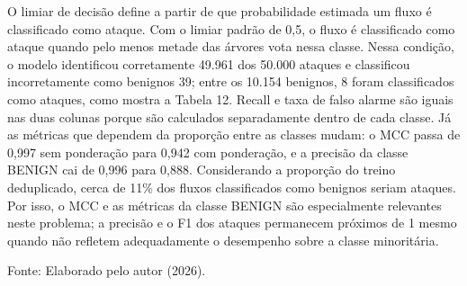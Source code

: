 \documentclass[
    12pt,                %
    openright,           %
    oneside,             %
    a4paper,             %
    english,             %
    brazil               %
]{abntex2}
\begin{document}
O limiar de decisão define a partir de que probabilidade estimada um fluxo é classificado como ataque. Com o limiar padrão de 0,5, o fluxo é classificado como ataque quando pelo menos metade das árvores vota nessa classe. Nessa condição, o modelo identificou corretamente 49.961 dos 50.000 ataques e classificou incorretamente como benignos 39; entre os 10.154 benignos, 8 foram classificados como ataques, como mostra a Tabela 12. Recall e taxa de falso alarme são iguais nas duas colunas porque são calculados separadamente dentro de cada classe. Já as métricas que dependem da proporção entre as classes mudam: o MCC passa de 0,997 sem ponderação para 0,942 com ponderação, e a precisão da classe BENIGN cai de 0,996 para 0,888. Considerando a proporção do treino deduplicado, cerca de 11\% dos fluxos classificados como benignos seriam ataques. Por isso, o MCC e as métricas da classe BENIGN são especialmente relevantes neste problema; a precisão e o F1 dos ataques permanecem próximos de 1 mesmo quando não refletem adequadamente o desempenho sobre a classe minoritária.

\begin{table}
\centering
\caption{Métricas do RF na validação (limiar 0,5)}
\label{tab:metricas-rf-validacao}
\par\smallskip
Fonte: Elaborado pelo autor (2026).
\end{table}
\end{document}
